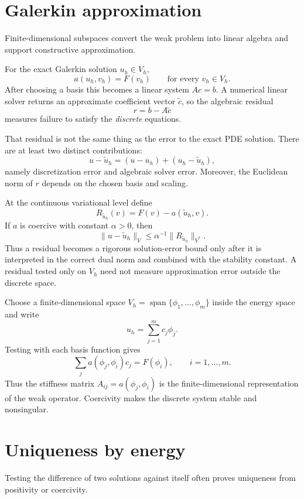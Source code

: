 \section{Galerkin approximation}
Finite-dimensional subspaces convert the weak problem into linear algebra and support constructive approximation.

\begin{remark}
For the exact Galerkin solution \(u_h\in V_h\),
\[
a(u_h,v_h)=F(v_h)
\qquad\text{for every }v_h\in V_h.
\]
After choosing a basis this becomes a linear system \(Ac=b\).  A numerical
linear solver returns an approximate coefficient vector \(\widetilde c\), so
the algebraic residual
\[
r=b-A\widetilde c
\]
measures failure to satisfy the \emph{discrete} equations.

That residual is not the same thing as the error to the exact PDE solution.
There are at least two distinct contributions:
\[
u-\widetilde u_h
=
(u-u_h)+(u_h-\widetilde u_h),
\]
namely discretization error and algebraic solver error.  Moreover, the
Euclidean norm of \(r\) depends on the chosen basis and scaling.

At the continuous variational level define
\[
R_{\widetilde u_h}(v)
=
F(v)-a(\widetilde u_h,v).
\]
If \(a\) is coercive with constant \(\alpha>0\), then
\[
\|u-\widetilde u_h\|_V
\le
\alpha^{-1}\|R_{\widetilde u_h}\|_{V^*}.
\]
Thus a residual becomes a rigorous solution-error bound only after it is
interpreted in the correct dual norm and combined with the stability constant.
A residual tested only on \(V_h\) need not measure approximation error outside
the discrete space.
\end{remark}


\begin{example}\label{ex:iii23-expand-03}
Choose a finite-dimensional space \(V_h=\operatorname{span}\{\phi_1,\ldots,\phi_m\}\)
inside the energy space and write
\[
u_h=\sum_{j=1}^m c_j\phi_j.
\]
Testing with each basis function gives
\[
\sum_j a(\phi_j,\phi_i)c_j=F(\phi_i),\qquad i=1,\ldots,m.
\]
Thus the stiffness matrix \(A_{ij}=a(\phi_j,\phi_i)\) is the finite-dimensional
representation of the weak operator. Coercivity makes the discrete system
stable and nonsingular.
\end{example}
\section{Uniqueness by energy}
Testing the difference of two solutions against itself often proves uniqueness from positivity or coercivity.

